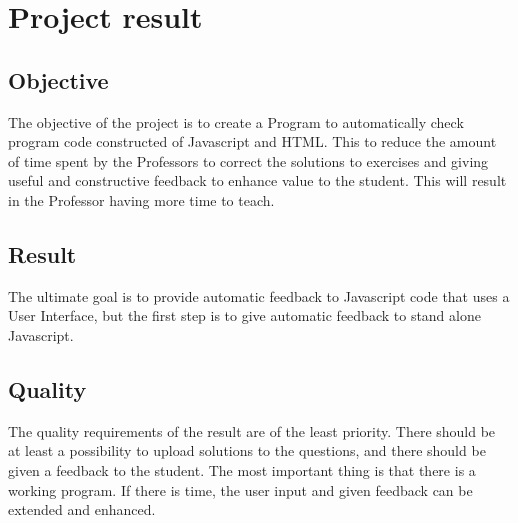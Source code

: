 \documentclass{article}
\begin{document}
\section{Project result}

\subsection{Objective}

The objective of the project is to create a Program to automatically check program code constructed of Javascript and HTML. This to reduce the amount of time spent by the Professors to correct the solutions to exercises and giving useful and constructive feedback to enhance value to the student. 
This will result in the Professor having more time to teach. 

\subsection{Result}

The ultimate goal is to provide automatic feedback to Javascript code that uses a User Interface, but the first step is to give automatic feedback to stand alone Javascript.

\subsection{Quality}

The quality requirements of the result are of the least priority. There should be at least a possibility to upload solutions to the questions, and there should be given a feedback to the student. The most important thing is that there is a working program. If there is time, the user input and given feedback can be extended and enhanced.
\end{document}
